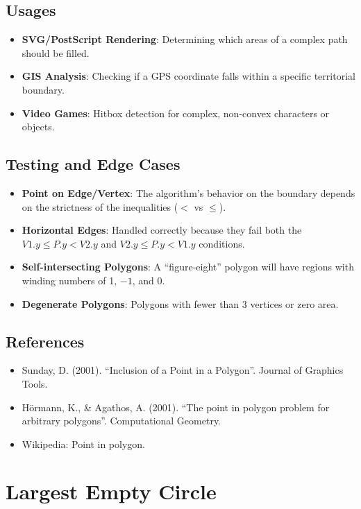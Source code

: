 \subsection{Usages}

\begin{itemize}
\item \textbf{SVG/PostScript Rendering}: Determining which areas of a complex path should be filled.
\item \textbf{GIS Analysis}: Checking if a GPS coordinate falls within a specific territorial boundary.
\item \textbf{Video Games}: Hitbox detection for complex, non-convex characters or objects.
\end{itemize}

\subsection{Testing and Edge Cases}

\begin{itemize}
\item \textbf{Point on Edge/Vertex}: The algorithm's behavior on the boundary depends on the strictness of the inequalities ($<$ vs $\le$).
\item \textbf{Horizontal Edges}: Handled correctly because they fail both the $V1.y \le P.y < V2.y$ and $V2.y \le P.y < V1.y$ conditions.
\item \textbf{Self-intersecting Polygons}: A ``figure-eight'' polygon will have regions with winding numbers of 1, $-1$, and 0.
\item \textbf{Degenerate Polygons}: Polygons with fewer than 3 vertices or zero area.
\end{itemize}

\subsection{References}

\begin{itemize}
\item Sunday, D. (2001). ``Inclusion of a Point in a Polygon''. Journal of Graphics Tools.
\item H\"{o}rmann, K., \& Agathos, A. (2001). ``The point in polygon problem for arbitrary polygons''. Computational Geometry.
\item Wikipedia: Point in polygon.
\end{itemize}


\section{Largest Empty Circle}
\label{sec:largest_empty_circle}

